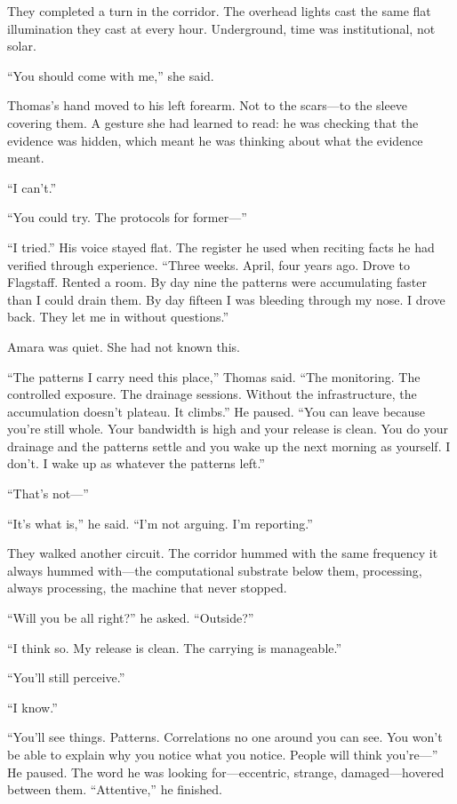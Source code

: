 They completed a turn in the corridor. The overhead lights cast the same flat illumination they cast at every hour. Underground, time was institutional, not solar.

``You should come with me,'' she said.

Thomas's hand moved to his left forearm. Not to the scars---to the sleeve covering them. A gesture she had learned to read: he was checking that the evidence was hidden, which meant he was thinking about what the evidence meant.

``I can't.''

``You could try. The protocols for former---''

``I tried.'' His voice stayed flat. The register he used when reciting facts he had verified through experience. ``Three weeks. April, four years ago. Drove to Flagstaff. Rented a room. By day nine the patterns were accumulating faster than I could drain them. By day fifteen I was bleeding through my nose. I drove back. They let me in without questions.''

Amara was quiet. She had not known this.

``The patterns I carry need this place,'' Thomas said. ``The monitoring. The controlled exposure. The drainage sessions. Without the infrastructure, the accumulation doesn't plateau. It climbs.'' He paused. ``You can leave because you're still whole. Your bandwidth is high and your release is clean. You do your drainage and the patterns settle and you wake up the next morning as yourself. I don't. I wake up as whatever the patterns left.''

``That's not---''

``It's what is,'' he said. ``I'm not arguing. I'm reporting.''

They walked another circuit. The corridor hummed with the same frequency it always hummed with---the computational substrate below them, processing, always processing, the machine that never stopped.

``Will you be all right?'' he asked. ``Outside?''

``I think so. My release is clean. The carrying is manageable.''

``You'll still perceive.''

``I know.''

``You'll see things. Patterns. Correlations no one around you can see. You won't be able to explain why you notice what you notice. People will think you're---'' He paused. The word he was looking for---eccentric, strange, damaged---hovered between them. ``Attentive,'' he finished.

